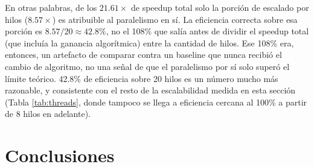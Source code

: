 \documentclass[11pt]{article}
\begin{document}
En otras palabras, de los $21.61\times$ de speedup total solo la porción
de escalado por hilos ($8.57\times$) es atribuible al paralelismo en sí.
La eficiencia correcta sobre esa porción es $8.57/20 \approx 42.8\%$, no
el 108\% que salía antes de dividir el speedup total (que incluía la
ganancia algorítmica) entre la cantidad de hilos. Ese 108\% era, entonces,
un artefacto de comparar contra un baseline que nunca recibió el cambio
de algoritmo, no una señal de que el paralelismo por sí solo superó el
límite teórico. 42.8\% de eficiencia sobre 20 hilos es un número mucho
más razonable, y consistente con el resto de la escalabilidad medida en
esta sección (Tabla \ref{tab:threads}, donde tampoco se llega a
eficiencia cercana al 100\% a partir de 8 hilos en adelante).

\clearpage

\section{Conclusiones}
\end{document}
